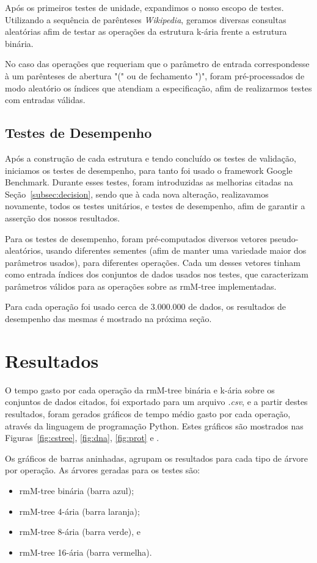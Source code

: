 Após os primeiros testes de unidade, expandimos o nosso escopo de testes. Utilizando a sequência de parênteses \textit{Wikipedia}, geramos diversas consultas aleatórias afim de testar as operações da estrutura k-ária frente a estrutura binária.

No caso das operações que requeriam que o parâmetro de entrada correspondesse à um parênteses de abertura "(" ou de fechamento ")", foram pré-processados de modo aleatório os índices que atendiam a especificação, afim de realizarmos testes com entradas válidas.

\subsection{Testes de Desempenho}\label{sec:benchmark}
Após a construção de cada estrutura e tendo concluído os testes de validação, iniciamos os testes de desempenho, para tanto foi usado o framework Google Benchmark. Durante esses testes, foram introduzidas as melhorias citadas na Seção~\ref{subsec:decision}, sendo que à cada nova alteração, realizavamos novamente, todos os testes unitários, e testes de desempenho, afim de garantir a asserção dos nossos resultados.

Para os testes de desempenho, foram pré-computados diversos vetores pseudo-aleatórios, usando diferentes sementes (afim de manter uma variedade maior dos parâmetros usados), para diferentes operações. Cada um desses vetores tinham como entrada  índices dos conjuntos de dados usados nos testes, que caracterizam parâmetros válidos para as operações sobre as rmM-tree implementadas. 

Para cada operação foi usado cerca de $3.000.000$ de dados, os resultados de desempenho das mesmas é mostrado na próxima seção.

\section{Resultados}\label{sec:resultados}
O tempo gasto por cada operação da rmM-tree binária e k-ária sobre os conjuntos de dados citados, foi exportado para um arquivo \textit{.csv}, e a partir destes resultados, foram gerados gráficos de tempo médio gasto por cada operação, através da linguagem de programação Python. Estes gráficos são mostrados nas Figuras~\ref{fig:cstree}, \ref{fig:dna}, \ref{fig:prot} e .

Os gráficos de barras aninhadas, agrupam os resultados para cada tipo de árvore por operação. As árvores geradas para os testes são:
\begin{itemize}
  \item rmM-tree binária (barra azul);
  \item rmM-tree 4-ária (barra laranja);
  \item rmM-tree 8-ária (barra verde), e
  \item rmM-tree 16-ária (barra vermelha).
\end{itemize}

